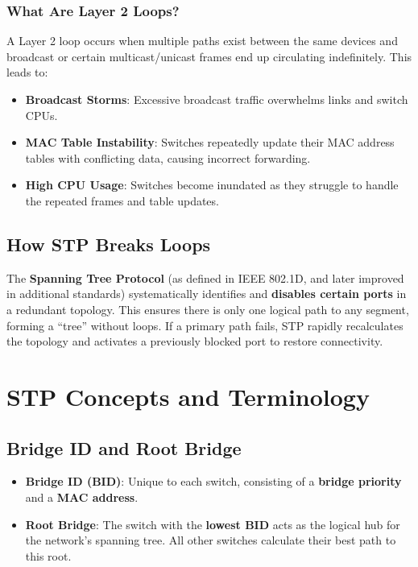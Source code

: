 \documentclass[a4paper]{report}
\begin{document}
\subsubsection{What Are Layer 2 Loops?}
A Layer 2 loop occurs when multiple paths exist between the same devices and broadcast or certain multicast/unicast frames end up circulating indefinitely. This leads to:
\begin{itemize}
  \item \textbf{Broadcast Storms}: Excessive broadcast traffic overwhelms links and switch CPUs.
  \item \textbf{MAC Table Instability}: Switches repeatedly update their MAC address tables with conflicting data, causing incorrect forwarding.
  \item \textbf{High CPU Usage}: Switches become inundated as they struggle to handle the repeated frames and table updates.
\end{itemize}

\subsection{How STP Breaks Loops}
The \textbf{Spanning Tree Protocol} (as defined in IEEE 802.1D, and later improved in additional standards) systematically identifies and \textbf{disables certain ports} in a redundant topology. This ensures there is only one logical path to any segment, forming a \textquotedblleft tree\textquotedblright{} without loops. If a primary path fails, STP rapidly recalculates the topology and activates a previously blocked port to restore connectivity.

\section{STP Concepts and Terminology}
\subsection{Bridge ID and Root Bridge}
\begin{itemize}
  \item \textbf{Bridge ID (BID)}: Unique to each switch, consisting of a \textbf{bridge priority} and a \textbf{MAC address}.
  \item \textbf{Root Bridge}: The switch with the \textbf{lowest BID} acts as the logical hub for the network’s spanning tree. All other switches calculate their best path to this root.
\end{itemize}
\end{document}

